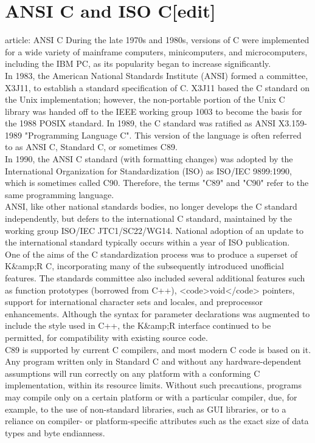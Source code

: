 \documentclass{article}\usepackage{titlesec}
\begin{document}
\section{ANSI C and ISO C[edit]}
\itemMain article: ANSI C
During the late 1970s and 1980s, versions of C were implemented for a wide variety of mainframe computers, minicomputers, and microcomputers, including the IBM PC, as its popularity began to increase significantly.
\\
In 1983, the American National Standards Institute (ANSI) formed a committee, X3J11, to establish a standard specification of C. X3J11 based the C standard on the Unix implementation; however, the non-portable portion of the Unix C library was handed off to the IEEE working group 1003 to become the basis for the 1988 POSIX standard. In 1989, the C standard was ratified as ANSI X3.159-1989 "Programming Language C".  This version of the language is often referred to as ANSI C, Standard C, or sometimes C89.
\\
In 1990, the ANSI C standard (with formatting changes) was adopted by the International Organization for Standardization (ISO) as ISO/IEC 9899:1990, which is sometimes called C90. Therefore, the terms "C89" and "C90" refer to the same programming language.
\\
ANSI, like other national standards bodies, no longer develops the C standard independently, but defers to the international C standard, maintained by the working group ISO/IEC JTC1/SC22/WG14.  National adoption of an update to the international standard typically occurs within a year of ISO publication.
\\
One of the aims of the C standardization process was to produce a superset of K&amp;R C, incorporating many of the subsequently introduced unofficial features. The standards committee also included several additional features such as function prototypes (borrowed from C++), <code>void</code> pointers, support for international character sets and locales, and preprocessor enhancements. Although the syntax for parameter declarations was augmented to include the style used in C++, the K&amp;R interface continued to be permitted, for compatibility with existing source code.
\\
C89 is supported by current C compilers, and most modern C code is based on it. Any program written only in Standard C and without any hardware-dependent assumptions will run correctly on any platform with a conforming C implementation, within its resource limits.  Without such precautions, programs may compile only on a certain platform or with a particular compiler, due, for example, to the use of non-standard libraries, such as GUI libraries, or to a reliance on compiler- or platform-specific attributes such as the exact size of data types and byte endianness.
\end{document}
